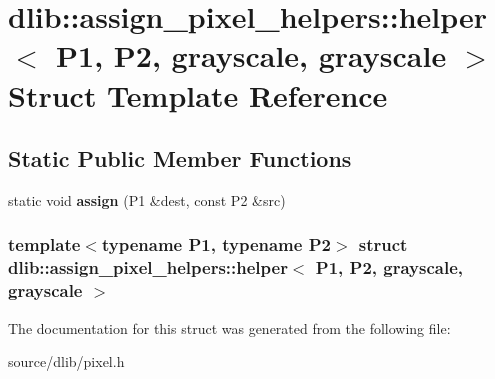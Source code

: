 \hypertarget{structdlib_1_1assign__pixel__helpers_1_1helper_3_01P1_00_01P2_00_01grayscale_00_01grayscale_01_4}{
\section{dlib::assign\_\-pixel\_\-helpers::helper$<$ P1, P2, grayscale, grayscale $>$ Struct Template Reference}
\label{structdlib_1_1assign__pixel__helpers_1_1helper_3_01P1_00_01P2_00_01grayscale_00_01grayscale_01_4}
}
\subsection*{Static Public Member Functions}
\begin{DoxyCompactItemize}
\item 
\hypertarget{structdlib_1_1assign__pixel__helpers_1_1helper_3_01P1_00_01P2_00_01grayscale_00_01grayscale_01_4_a001417cca981b59106bc94d0988805c2}{
static void {\bfseries assign} (P1 \&dest, const P2 \&src)}
\label{structdlib_1_1assign__pixel__helpers_1_1helper_3_01P1_00_01P2_00_01grayscale_00_01grayscale_01_4_a001417cca981b59106bc94d0988805c2}

\end{DoxyCompactItemize}
\subsubsection*{template$<$typename P1, typename P2$>$ struct dlib::assign\_\-pixel\_\-helpers::helper$<$ P1, P2, grayscale, grayscale $>$}



The documentation for this struct was generated from the following file:\begin{DoxyCompactItemize}
\item 
source/dlib/pixel.h\end{DoxyCompactItemize}
